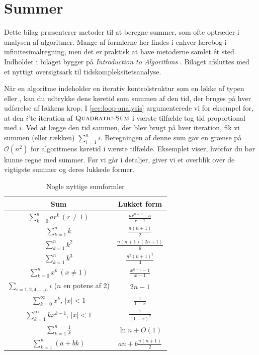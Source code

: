 \chapter{Summer}\label{app:appendix01}

Dette bilag præsenterer metoder til at beregne summer, som ofte optræder i analysen af algoritmer. Mange
af formlerne her findes i enhver lærebog i infinitesimalregning, men det er praktisk at have metoderne samlet ét sted. Indholdet i bilaget bygger på \textit{Introduction to Algorithms} \cite{clrs4}. Bilaget afsluttes med et nyttigt oversigtsark til tidskompleksitetsanalyse.

Når en algoritme indeholder en iterativ kontrolstruktur som en løkke af typen \While eller \For\unskip, kan du udtrykke dens køretid som summen af den tid, der bruges på hver udførelse af løkkens krop. I \autoref{sec:loop-analysis} argumenterede vi for eksempel for, at den $i$'te iteration af $\proc{Quadratic-Sum}$ i værste tilfælde tog tid proportional med $i$. Ved at lægge den tid sammen, der blev brugt på hver iteration, fik vi summen (eller rækken) $\sum\limits_{i=1}^n i$. Beregningen af denne sum gav en grænse på $\mathcal{O}(n^2)$ for algoritmens køretid i værste tilfælde. Eksemplet viser, hvorfor du bør kunne regne med summer. Før vi går i detaljer, giver vi et overblik over de vigtigste summer og deres lukkede former.

\begin{table}[htbp]
    \centering
    \renewcommand{\arraystretch}{2}
    \begin{tabular}{|c|c|}
    \hline
    \textbf{Sum} & \textbf{Lukket form} \\ \hline
    $\displaystyle \sum_{k=0}^n ar^k \, (r \neq 1)$ & $\displaystyle \frac{ar^{n+1} - a}{r - 1}$ \\ \hline
    $\displaystyle \sum_{k=1}^n k$ & $\displaystyle \frac{n(n+1)}{2}$ \\ \hline
    $\displaystyle \sum_{k=1}^n k^2$ & $\displaystyle \frac{n(n+1)(2n+1)}{6}$ \\ \hline
    $\displaystyle \sum_{k=1}^n k^3$ & $\displaystyle \frac{n^2(n+1)^2}{4}$ \\ \hline
    $\displaystyle \sum_{k=0}^n x^k \, (x \neq 1)$ & $\displaystyle \frac{x^{n+1} - 1}{x - 1}$ \\ \hline
    $\displaystyle \sum_{i=1,2,4,\ldots,n} i$ ($n$ en potens af 2) & $\displaystyle 2n - 1$ \\ \hline
    $\displaystyle \sum_{k=0}^\infty x^k, \, |x| < 1$ & $\displaystyle \frac{1}{1 - x}$ \\ \hline
    $\displaystyle \sum_{k=1}^\infty kx^{k-1}, \, |x| < 1$ & $\displaystyle \frac{1}{(1 - x)^2}$ \\ \hline
    $\displaystyle \sum_{k=1}^n \frac{1}{k}$ & $\displaystyle \ln n + O(1)$ \\ \hline
    $\displaystyle \sum_{k=1}^n (a + bk)$ & $\displaystyle a n + b \frac{n(n+1)}{2}$ \\ \hline  
    \end{tabular}
    \caption{Nogle nyttige sumformler}
\end{table}



